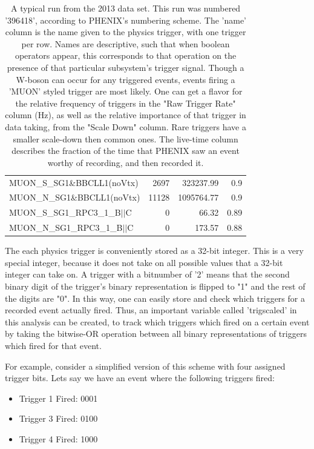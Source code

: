\begin{table}
{\begin{tabular}{lrrr}
      MUON\_S\_SG1\&BBCLL1(noVtx) & 2697 & 323237.99 & 0.9 \\
      MUON\_N\_SG1\&BBCLL1(noVtx) & 11128 & 1095764.77 & 0.9 \\
      MUON\_S\_SG1\_RPC3\_1\_B$\vert\vert$C & 0 & 66.32 & 0.89 \\
      MUON\_N\_SG1\_RPC3\_1\_B$\vert\vert$C & 0 & 173.57 & 0.88 \\
      \bottomrule
    \end{tabular}
  }
  \caption{
    A typical run from the 2013 data set. This run was numbered '396418',
    according to PHENIX's numbering scheme. The 'name' column is the name given
    to the physics trigger, with one trigger per row. Names are descriptive,
    such that when boolean operators appear, this corresponds to that operation
    on the presence of that particular subsystem's trigger signal. Though a
    W-boson can occur for any triggered events, events firing a 'MUON' styled
    trigger are most likely. One can get a flavor for the relative frequency of
    triggers in the "Raw Trigger Rate" column (Hz), as well as the relative
    importance of that trigger in data taking, from the "Scale Down" column.
    Rare triggers have a smaller scale-down then common ones. The live-time
    column describes the fraction of the time that PHENIX saw an event worthy of
    recording, and then recorded it.
  }
  \label{tab:typical_run}
\end{table}

The each physics trigger is conveniently stored as a 32-bit integer. This is a
very special integer, because it does not take on all possible values that a
32-bit integer can take on. A trigger with a bitnumber of '2' means that the
second binary digit of the trigger's binary representation is flipped to "1" and
the rest of the digits are "0". In this way, one can easily store and check
which triggers for a recorded event actually fired. Thus, an important variable
called 'trigscaled' in this analysis can be created, to track which triggers
which fired on a certain event by taking the bitwise-OR operation between all
binary representations of triggers which fired for that event.

For example, consider a simplified version of this scheme with four assigned
trigger bits. Lets say we have an event where the following triggers fired:

\begin{itemize}
    \item Trigger 1 Fired: 0001
    \item Trigger 3 Fired: 0100
    \item Trigger 4 Fired: 1000
\end{itemize}

